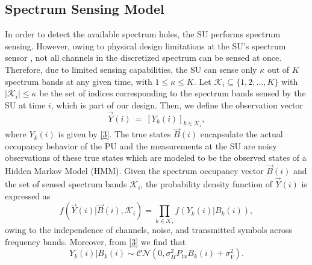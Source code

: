 \documentclass[10pt,twocolumn]{IEEEtran}
\begin{document}
\subsection{Spectrum Sensing Model}
In order to detect the available spectrum holes, the SU performs spectrum sensing. However, owing to physical design limitations at the SU's spectrum sensor \cite{5990482}, not all channels in the discretized spectrum can be sensed at once. Therefore, due to limited sensing capabilities, the SU can sense only $\kappa$ out of $K$ spectrum bands at any given time, with $1\leq \kappa\leq K$. Let $\mathcal K_{i}\subseteq\{1,2,\dots,K\}$ with $|\mathcal K_i|\leq \kappa$ be the set of indices corresponding to the spectrum bands sensed by the SU at time $i$, which is part of our design.
Then, we define the observation vector
\begin{equation}\label{8}
    \vec{Y}(i)\ =\ [Y_k(i)]_{k\in\mathcal K_i},
\end{equation}
where $Y_k(i)$ is given by \eqref{3}.
The true states $\vec{B}(i)$ encapsulate the actual occupancy behavior of the PU and the measurements at the SU are noisy observations of these true states which are modeled to be the observed states of a Hidden Markov Model (HMM). Given the spectrum occupancy vector $\vec{B}(i)$ and the set of sensed spectrum bands $\mathcal K_i$, the probability density function of $\vec{Y}(i)$ is expressed as
\begin{equation}\label{9}
    f(\vec{Y}(i)|\vec{B}(i),\mathcal K_i)=\prod_{k\in\mathcal K_i}f(Y_k(i)|B_k(i)),
\end{equation}
owing to the independence of channels, noise, and transmitted symbols across frequency bands. Moreover, from \eqref{3} we find that
\begin{equation}\label{10}
 Y_k(i)|B_k(i)\sim \mathcal{CN}(0,\sigma_H^2P_{tx}B_k(i)+\sigma_V^2).
\end{equation}
\end{document}
